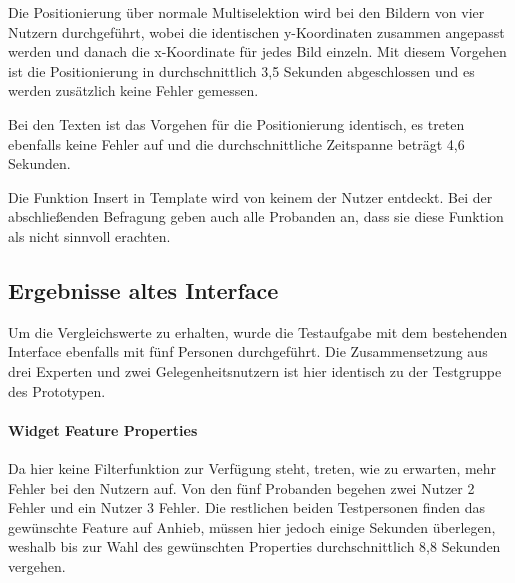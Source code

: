 Die Positionierung über normale Multiselektion wird bei den Bildern von vier Nutzern durchgeführt, wobei die identischen y-Koordinaten zusammen angepasst werden und danach die x-Koordinate für jedes Bild einzeln.
Mit diesem Vorgehen ist die Positionierung in durchschnittlich 3,5 Sekunden abgeschlossen und es werden zusätzlich keine Fehler gemessen.

Bei den Texten ist das Vorgehen für die Positionierung identisch, es treten ebenfalls keine Fehler auf und die durchschnittliche Zeitspanne beträgt 4,6 Sekunden.

Die Funktion \glqq Insert in Template\grqq{} wird von keinem der Nutzer entdeckt. Bei der abschließenden Befragung geben auch alle Probanden an, dass sie diese Funktion als nicht sinnvoll erachten.

\subsection{Ergebnisse altes Interface}
Um die Vergleichswerte zu erhalten, wurde die Testaufgabe mit dem bestehenden Interface ebenfalls mit fünf Personen durchgeführt.
Die Zusammensetzung aus drei Experten und zwei Gelegenheitsnutzern ist hier identisch zu der Testgruppe des Prototypen.

\paragraph{Widget Feature Properties}
Da hier keine Filterfunktion zur Verfügung steht, treten, wie zu erwarten, mehr Fehler bei den Nutzern auf.
Von den fünf Probanden begehen zwei Nutzer 2 Fehler und ein Nutzer 3 Fehler.
Die restlichen beiden Testpersonen finden das gewünschte Feature auf Anhieb, müssen hier jedoch einige Sekunden überlegen, weshalb bis zur Wahl des gewünschten Properties durchschnittlich 8,8 Sekunden vergehen.

